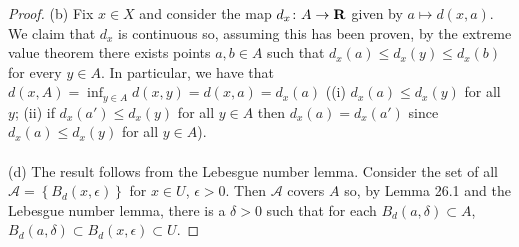 \begin{proof}
(b) Fix $x\in X$ and consider the map $d_x\colon A\to\mathbf{R}$ given by
$a\mapsto d(x,a)$. We claim that $d_x$ is continuous so, assuming this
has been proven, by the extreme value theorem there exists points
$a,b\in A$ such that $d_x(a)\leq d_x(y)\leq d_x(b)$ for every $y\in
A$. In particular, we have that $d(x,A)=\inf_{y\in
  A}d(x,y)=d(x,a)=d_x(a)$ ((i) $d_x(a)\leq d_x(y)$ for all $y$; (ii)
if $d_x(a')\leq d_x(y)$ for all $y\in A$ then $d_x(a)=d_x(a')$ since
$d_x(a)\leq d_x(y)$ for all $y\in A$).
\\\\
(d) The result follows from the Lebesgue number lemma. Consider the
set of all $\mathcal{A}=\left\{B_d(x,\epsilon)\right\}$ for $x\in U$,
$\epsilon>0$. Then $\mathcal{A}$ covers $A$ so, by Lemma 26.1 and the
Lebesgue number lemma, there is a $\delta>0$ such that for each
$B_d(a,\delta)\subset A$, $B_d(a,\delta)\subset B_d(x,\epsilon)\subset
U$.
\end{proof}

